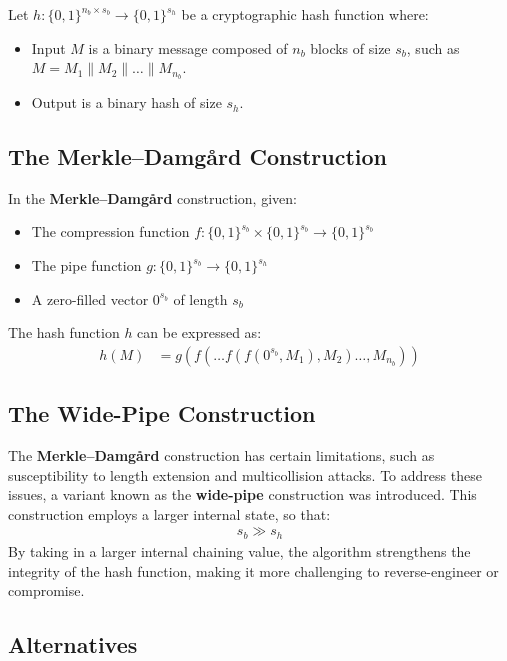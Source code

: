 \documentclass[10pt]{article}
\begin{document}
Let \( h: \{0,1\}^{n_b \times s_b} \to \{0,1\}^{s_h} \) be a cryptographic hash function where: 

\begin{itemize}
    \item Input \( M \) is a binary message composed of \( n_b \) blocks of size \( s_b \),
    such as \( M = M_1 \parallel M_2 \parallel \ldots \parallel M_{n_b} \).
    \item Output is a binary hash of size \( s_h \).
\end{itemize}

\subsection{The Merkle–Damgård Construction}

In the \textbf{Merkle–Damgård} construction, given:
\begin{itemize}
    \item The compression function \( f: \{0,1\}^{s_b} \times \{0,1\}^{s_b} \to \{0,1\}^{s_b} \)
    \item The pipe function \( g: \{0,1\}^{s_b} \to \{0,1\}^{s_h} \)
    \item A zero-filled vector \( 0^{s_b} \) of length \( s_b \)
\end{itemize}
The hash function \( h \) can be expressed as:
\begin{align*}
    h(M) &= g\left( f(\ldots f(f(0^{s_b}, M_1), M_2) \ldots, M_{n_b}) \right)
\end{align*}

\subsection{The Wide-Pipe Construction} \label{widepipe}

The \textbf{Merkle–Damgård} construction has certain limitations, such as susceptibility to length extension and multicollision attacks.
To address these issues, a variant known as the \textbf{wide-pipe} construction was introduced.
This construction employs a larger internal state, so that:
\begin{align*}
    s_b \gg s_h
\end{align*}
By taking in a larger internal chaining value, the algorithm strengthens the integrity of the hash function,
making it more challenging to reverse-engineer or compromise.

\subsection{Alternatives}
\end{document}
